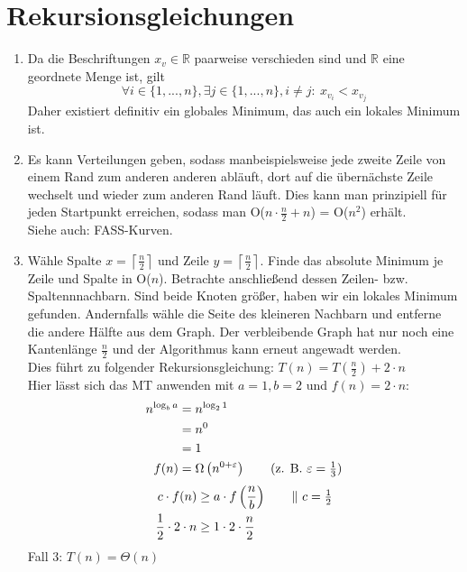 \documentclass[a4paper,10pt]{article}
\begin{document}
\section{Rekursionsgleichungen}
\begin{enumerate}
\item   Da die Beschriftungen $x_v \in \mathbb{R}$ paarweise verschieden sind und $\mathbb{R}$ eine geordnete Menge ist, gilt 
        \[\forall i \in \{1, ..., n\}, \exists j \in \{1, ..., n\}, i \neq j{:}\ x_{v_i} < x_{v_j}\]
        Daher existiert definitiv ein globales Minimum, das auch ein lokales Minimum ist.
\item  Es kann Verteilungen geben, sodass manbeispielsweise jede zweite Zeile von einem Rand zum anderen anderen abläuft, dort auf die übernächste Zeile wechselt und wieder zum anderen Rand läuft. Dies kann man prinzipiell für jeden Startpunkt erreichen, sodass man O($n \cdot \frac{n}{2} + n$) = O($n^2$) erhält.\\
Siehe auch: FASS-Kurven.
\item Wähle Spalte $x = \left\lceil\frac{n}{2}\right\rceil$ und Zeile $y = \left\lceil\frac{n}{2}\right\rceil$. Finde das absolute Minimum je Zeile und Spalte in O($n$). Betrachte anschließend dessen Zeilen- bzw. Spaltennnachbarn. Sind beide Knoten größer, haben wir ein lokales Minimum gefunden. Andernfalls wähle die Seite des kleineren Nachbarn und entferne die andere Hälfte aus dem Graph. Der verbleibende Graph hat nur noch eine Kantenlänge $\frac{n}{2}$ und der Algorithmus kann erneut angewadt werden.\\
Dies führt zu folgender Rekursionsgleichung: $T(n) = T\left(\frac{n}{2}\right) + 2\cdot n$\\
Hier lässt sich das MT anwenden mit $a = 1, b =2$ und $f(n) = 2 \cdot n$:
\begin{align*}
         n^{\log_b a} &= n^{\log_2 1} \\
                      &= n^0 \\
                      &= 1 \\
         f(n) &= \Omega\left(n^{0+\varepsilon}\right) \tag{z. B. $\varepsilon = \frac{1}{3}$}
\end{align*}
\begin{align*}
         c \cdot f(n) &\geq a \cdot f\left(\frac{n}{b}\right) \tag*{$\|\ c = \frac{1}{2}$} \\
         \frac{1}{2} \cdot 2 \cdot n &\geq 1 \cdot 2 \cdot \frac{n}{2}
\end{align*}
Fall 3: $T(n) = \Theta(n)$\\

\end{enumerate}
\end{document}
